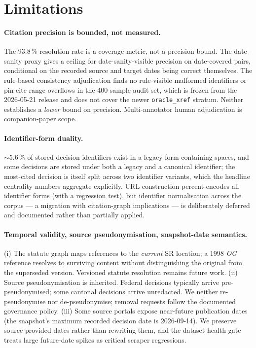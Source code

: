 \documentclass[11pt,a4paper]{article}
\begin{document}
\section{Limitations}\label{sec:limit}

\paragraph{Citation precision is bounded, not measured.} The 93.8\,\% resolution rate is a coverage metric, not a precision bound. The date-sanity proxy gives a ceiling for date-sanity-visible precision on date-covered pairs, conditional on the recorded source and target dates being correct themselves. The rule-based consistency adjudication finds no rule-visible malformed identifiers or pin-cite range overflows in the 400-sample audit set, which is frozen from the 2026-05-21 release and does not cover the newer \texttt{oracle\_xref} stratum. Neither establishes a \emph{lower} bound on precision. Multi-annotator human adjudication is companion-paper scope.

\paragraph{Identifier-form duality.} $\sim$5.6\,\% of stored decision identifiers exist in a legacy form containing spaces, and some decisions are stored under both a legacy and a canonical identifier; the most-cited decision is itself split across two identifier variants, which the headline centrality numbers aggregate explicitly. URL construction percent-encodes all identifier forms (with a regression test), but identifier normalisation across the corpus --- a migration with citation-graph implications --- is deliberately deferred and documented rather than partially applied.

\paragraph{Temporal validity, source pseudonymisation, snapshot-date semantics.} (i) The statute graph maps references to the \emph{current} SR location; a 1998 \emph{OG} reference resolves to surviving content without distinguishing the original from the superseded version. Versioned statute resolution remains future work. (ii) Source pseudonymisation is inherited. Federal decisions typically arrive pre-pseudonymised; some cantonal decisions arrive unredacted. We neither re-pseudonymise nor de-pseudonymise; removal requests follow the documented governance policy. (iii) Some source portals expose near-future publication dates (the snapshot's maximum recorded decision date is 2026-09-14). We preserve source-provided dates rather than rewriting them, and the dataset-health gate treats large future-date spikes as critical scraper regressions.
\end{document}

